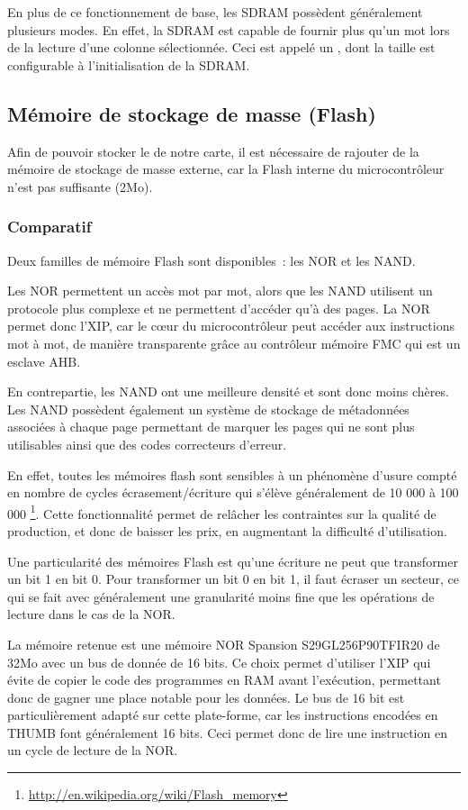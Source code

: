         
En plus de ce fonctionnement de base, les SDRAM possèdent généralement plusieurs modes.
En effet, la SDRAM est capable de fournir plus qu'un mot lors de la lecture d'une colonne sélectionnée.
Ceci est appelé un , dont la taille est configurable à l'initialisation de la SDRAM.

\subsection{Mémoire de stockage de masse (Flash)}
Afin de pouvoir stocker le  de notre carte, il est nécessaire de rajouter de la mémoire de stockage de masse externe, car la Flash interne du microcontrôleur n'est pas suffisante (2Mo).
        
\subsubsection{Comparatif}		
Deux familles de mémoire Flash sont disponibles~: les NOR et les NAND.
            
Les NOR permettent un accès mot par mot, alors que les NAND utilisent un protocole plus complexe et ne permettent d'accéder qu'à des pages.
La NOR permet donc l'\gls{XIP}, car le cœur du microcontrôleur peut accéder aux instructions mot à mot, de manière transparente grâce au contrôleur mémoire \gls{FMC} qui est un esclave \gls{AHB}.
            
En contrepartie, les NAND ont une meilleure densité et sont donc moins chères.
Les NAND possèdent également un système de stockage de métadonnées associées à chaque page permettant de marquer les pages qui ne sont plus utilisables ainsi que des codes correcteurs d'erreur.
            
En effet, toutes les mémoires flash sont sensibles à un phénomène d'usure compté en nombre de cycles écrasement/écriture qui s'élève généralement de 10 000 à 100 000 \footnote{\url{http://en.wikipedia.org/wiki/Flash_memory}}.
Cette fonctionnalité permet de relâcher les contraintes sur la qualité de production, et donc de baisser les prix, en augmentant la difficulté d'utilisation.
            
Une particularité des mémoires Flash est qu'une écriture ne peut que transformer un bit 1 en bit 0.
Pour transformer un bit 0 en bit 1, il faut écraser un secteur, ce qui se fait avec généralement une granularité moins fine que les opérations de lecture dans le cas de la NOR.
            
La mémoire retenue est une mémoire NOR Spansion S29GL256P90TFIR20 de 32Mo avec un bus de donnée de 16 bits.
Ce choix permet d'utiliser l'\gls{XIP} qui évite de copier le code des programmes en RAM avant l'exécution, permettant donc de gagner une place notable pour les données.
Le bus de 16 bit est particulièrement adapté sur cette plate-forme, car les instructions encodées en  \gls{THUMB} font généralement 16 bits.
Ceci permet donc de lire une instruction en un cycle de lecture de la NOR.
            
